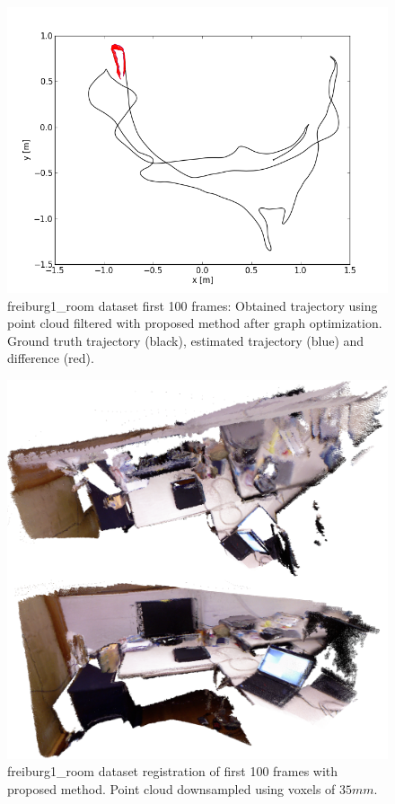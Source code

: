 \begin{figure}[H]
\begin{center}
\includegraphics[scale=0.75]{images/freiburg1_room_1_100_optimized.png}
\caption{freiburg1\_room dataset first 100 frames: Obtained trajectory using point cloud filtered with proposed method after graph optimization. Ground truth trajectory (black), estimated trajectory (blue) and difference (red).}
\label{fig:jan}
\end{center}
\end{figure}

\begin{figure}[H]
\begin{center}
\includegraphics[scale=0.27]{images/freiburg1_room.png}
\caption{freiburg1\_room dataset registration of first 100 frames with proposed method. Point cloud downsampled using voxels of $35mm$.}
\label{fig:jan}
\end{center}
\end{figure}


